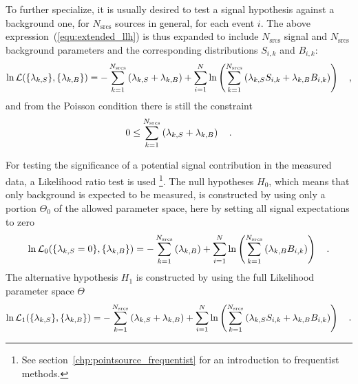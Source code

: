 To further specialize, it is usually desired to test a signal hypothesis against a background one, for $N_\text{srcs}$ sources in general, for each event $i$.
The above expression~(\ref{equ:extended_llh}) is thus expanded to include $N_\text{srcs}$ signal and $N_\text{srcs}$ background parameters and the corresponding distributions $S_{i,k}$ and $B_{i,k}$:
\begin{equation}
  \ln\mathcal{L}(\{\lambda_{k,S}\}, \{\lambda_{k,B}\})
  = -\sum_{k=1}^{N_\text{srcs}}\left(\lambda_{k,S}+\lambda_{k,B}\right) +
    \sum_{i=1}^N \ln\left(\sum_{k=1}^{N_\text{srcs}}\left(
      \lambda_{k,S} S_{i,k}+\lambda_{k,B} B_{i,k}\right)\right)
  \quad\text{,}
\end{equation}
and from the Poisson condition there is still the constraint
\begin{equation}
  0 \leq \sum_{k=1}^{N_\text{srcs}}\left(\lambda_{k,S}+\lambda_{k,B}\right)
  \quad\text{.}
\end{equation}

For testing the significance of a potential signal contribution in the measured data, a Likelihood ratio test is used \footnote{See section~\ref{chp:pointsource_frequentist} for an introduction to frequentist methods.}.
The null hypotheses $H_0$, which means that only background is expected to be measured, is constructed by using only a portion $\Theta_0$ of the allowed parameter space, here by setting all signal expectations to zero
\begin{equation}
  \ln\mathcal{L}_0(\{\lambda_{k,S}=0\}, \{\lambda_{k,B}\})
  = -\sum_{k=1}^{N_\text{srcs}}\left(\lambda_{k,B}\right) +
    \sum_{i=1}^N \ln\left(\sum_{k=1}^{N_\text{srcs}}\left(
      \lambda_{k,B} B_{i,k}\right)\right)
  \quad\text{.}
\end{equation}
The alternative hypothesis $H_1$ is constructed by using the full Likelihood parameter space $\Theta$
\begin{equation}
  \ln\mathcal{L}_1(\{\lambda_{k,S}\}, \{\lambda_{k,B}\})
  = -\sum_{k=1}^{N_\text{srcs}}\left(\lambda_{k,S}+
                                     \lambda_{k,B}\right) +
    \sum_{i=1}^N \ln\left(\sum_{k=1}^{N_\text{srcs}}\left(
      \lambda_{k,S} S_{i,k}+\lambda_{k,B} B_{i,k}\right)\right)
  \quad\text{.}
\end{equation}

